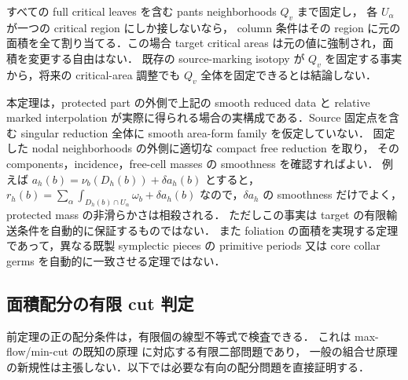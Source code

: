 \begin{remark}
すべての full critical leaves を含む pants neighborhoods $Q_v$ まで固定し，
各 $U_\alpha$ が一つの critical region にしか接しないなら，
column 条件はその region に元の面積を全て割り当てる．この場合 target critical
areas は元の値に強制され，面積を変更する自由はない．
既存の source-marking isotopy が $Q_v$ を固定する事実から，将来の
critical-area 調整でも $Q_v$ 全体を固定できるとは結論しない．

本定理は，protected part の外側で上記の smooth reduced data と relative marked
interpolation が実際に得られる場合の実構成である．Source 固定点を含む singular
reduction 全体に smooth area-form family を仮定していない．
固定した nodal neighborhoods の外側に適切な compact free reduction を取り，
その components，incidence，free-cell masses の smoothness を確認すればよい．
例えば $a_h(b)=\nu_b(D_h(b))+\delta a_h(b)$ とすると，
$r_h(b)=\sum_\alpha\int_{D_h(b)\cap U_\alpha}\omega_b+\delta a_h(b)$
なので，$\delta a_h$ の smoothness だけでよく，protected mass の非滑らかさは相殺される．
ただしこの事実は target の有限輸送条件を自動的に保証するものではない．
また foliation の面積を実現する定理であって，異なる既製 symplectic pieces の
primitive periods 又は core collar germs を自動的に一致させる定理ではない．
\end{remark}


\subsection{面積配分の有限 cut 判定}
\label{ng8:area-cut-section}

前定理の正の配分条件は，有限個の線型不等式で検査できる．
これは max-flow/min-cut の既知の原理
\cite[Theorem~1, p.~400]{FordFulkerson1956}に対応する有限二部問題であり，
一般の組合せ原理の新規性は主張しない．以下では必要な有向の配分問題を直接証明する．

